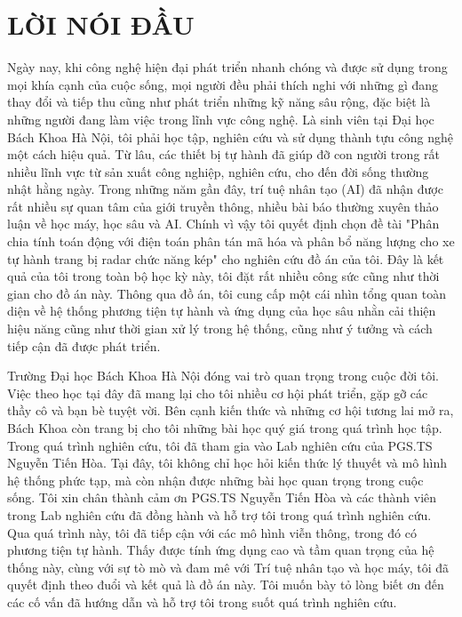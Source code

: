 \section*{LỜI NÓI ĐẦU}
\thispagestyle{empty}
Ngày nay, khi công nghệ hiện đại phát triển nhanh chóng và được sử dụng trong mọi khía cạnh của cuộc sống, mọi người đều phải thích nghi với những gì đang thay đổi và tiếp thu cũng như phát triển những kỹ năng sâu rộng, đặc biệt là những người đang làm việc trong lĩnh vực công nghệ. Là sinh viên tại Đại học Bách Khoa Hà Nội, tôi phải học tập, nghiên cứu và sử dụng thành tựu công nghệ một cách hiệu quả. Từ lâu, các thiết bị tự hành đã giúp đỡ con người trong rất nhiều lĩnh vực từ sản xuất công nghiệp, nghiên cứu, cho đến đời sống thường nhật hằng ngày. Trong những năm gần đây, trí tuệ nhân tạo (AI) đã nhận được rất nhiều sự quan tâm của giới truyền thông, nhiều bài báo thường xuyên thảo luận về học máy, học sâu và AI. Chính vì vậy tôi quyết định chọn đề tài "Phân chia tính toán động với điện toán phân tán mã hóa và phân bổ năng lượng cho xe tự hành trang bị radar chức năng kép" cho nghiên cứu đồ án của tôi. Đây là kết quả của tôi trong toàn bộ học kỳ này, tôi đặt rất nhiều công sức cũng như thời gian cho đồ án này. Thông qua đồ án, tôi cung cấp một cái nhìn tổng quan toàn diện về hệ thống phương tiện tự hành và ứng dụng của học sâu nhằn cải thiện hiệu năng cũng như thời gian xử lý trong hệ thống, cũng như ý tưởng và cách tiếp cận đã được phát triển. 

Trường Đại học Bách Khoa Hà Nội đóng vai trò quan trọng trong cuộc đời tôi. Việc theo học tại đây đã mang lại cho tôi nhiều cơ hội phát triển, gặp gỡ các thầy cô và bạn bè tuyệt vời. Bên cạnh kiến thức và những cơ hội tương lai mở ra, Bách Khoa còn trang bị cho tôi những bài học quý giá trong quá trình học tập. Trong quá trình nghiên cứu, tôi đã tham gia vào Lab nghiên cứu của PGS.TS Nguyễn Tiến Hòa. Tại đây, tôi không chỉ học hỏi kiến thức lý thuyết và mô hình hệ thống phức tạp, mà còn nhận được những bài học quan trọng trong cuộc sống. Tôi xin chân thành cảm ơn PGS.TS Nguyễn Tiến Hòa và các thành viên trong Lab nghiên cứu đã đồng hành và hỗ trợ tôi trong quá trình nghiên cứu. Qua quá trình này, tôi đã tiếp cận với các mô hình viễn thông, trong đó có phương tiện tự hành. Thấy được tính ứng dụng cao và tầm quan trọng của hệ thống này, cùng với sự tò mò và đam mê với Trí tuệ nhân tạo và học máy, tôi đã quyết định theo đuổi và kết quả là đồ án này. Tôi muốn bày tỏ lòng biết ơn đến các cố vấn đã hướng dẫn và hỗ trợ tôi trong suốt quá trình nghiên cứu.

